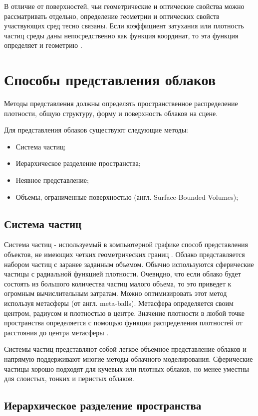 В отличие от поверхностей, чьи геометрические и оптические свойства можно рассматривать отдельно, определение геометрии и оптических свойств участвующих сред тесно связаны. Если коэффициент затухания или плотность частиц среды даны непосредственно как функция координат, то эта функция определяет и геометрию \cite{partmedia}.  


\section{Способы представления облаков}
Методы представления должны определять пространственное распределение плотности, общую структуру, форму и поверхность облаков на сцене.

Для представления облаков существуют следующие методы:
\begin{itemize}
	\item Система частиц;
	\item Иерархическое разделение пространства;
	\item Неявное представление;
	\item Объемы, ограниченные поверхностью (англ. Surface-Bounded Volumes);
\end{itemize}

\subsection{Система частиц}
\label{particles}
Система частиц - используемый в компьютерной графике способ представления объектов, не имеющих четких геометрических границ \cite{particles1}. 
Облако представляется набором частиц с заранее заданным объемом. Обычно используются сферические частицы с радиальной функцией плотности. Очевидно, что если облако будет состоять из большого количества частиц малого объема, то это приведет к огромным вычислительным затратам. Можно оптимизировать этот метод используя метасферы (от англ. meta-balls). Метасфера определяется своим центром, радиусом и плотностью в центре. Значение плотности в любой точке пространства определяется с помощью функции распределения плотностей от расстояния до центра метасферы \cite{nishita}. 

Системы частиц представляют собой легкое объемное представление облаков и напрямую поддерживают многие методы облачного моделирования. Сферические частицы хорошо подходят для кучевых или плотных облаков, но менее уместны для слоистых, тонких и перистых облаков.

\subsection{Иерархическое разделение пространства} 

